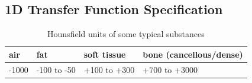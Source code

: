 \documentclass{egpubl}
\begin{document}
\subsection{1D Transfer Function Specification}

\begin{table}
	\centering
	\normalsize
	\begin{tabular}{llll}
		\hline
		air & fat & soft tissue & bone (cancellous/dense)\\
		\hline
		-1000 & -100 to -50 & +100 to +300 & +700 to +3000\\
		\hline
	\end{tabular}
	\caption{Hounsfield units of some typical substances \cite{feeman_mathematics_2009}}
	\label{table:Hounsfield_unit}
\end{table}
\end{document}
